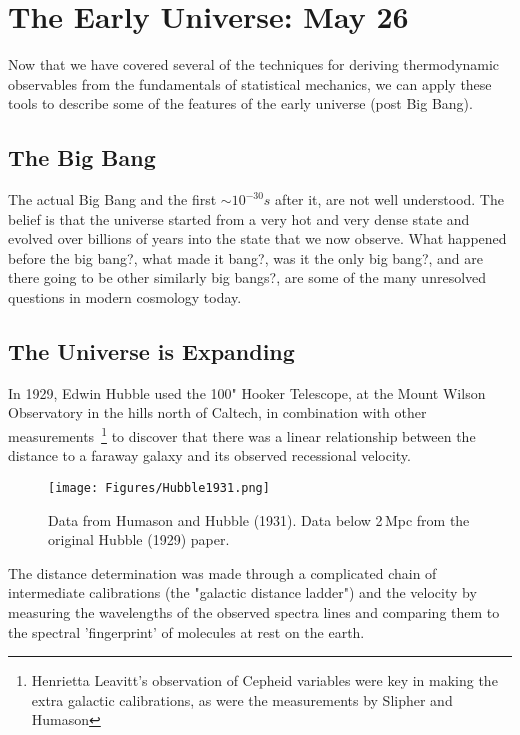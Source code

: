 \section{The Early Universe: May 26}
Now that we have covered several of the techniques for deriving thermodynamic observables from the fundamentals of statistical mechanics, we can apply these tools to describe some of the features of the early universe (post Big Bang).


\subsection{The Big Bang}
The actual Big Bang and the first $\sim 10^{-30} s$ after it, are not well understood. The belief is that the universe started from a very hot and very dense state and evolved over billions of years into the state that we now observe. What happened before the big bang?, what made it bang?, was it the only big bang?, and are there going to be other similarly big bangs?, are some of the many unresolved questions in modern cosmology today.

\subsection{The Universe is Expanding}
In 1929, Edwin Hubble used the 100" Hooker Telescope, at the Mount Wilson Observatory in the hills north of Caltech, in combination with other
measurements~\footnote{Henrietta Leavitt's observation of Cepheid variables were key in making the extra galactic calibrations, as were the measurements by
Slipher and Humason} to discover that there was a linear relationship between the distance to a faraway galaxy and its observed recessional velocity.
\begin{figure}[h]
\centering
\texttt{[image: Figures/Hubble1931.png]}
\caption{Data from Humason and Hubble (1931). Data below 2\,Mpc from
	the original Hubble (1929) paper.}
\label{fig:Hubble}
\end{figure}
The distance determination was made through a complicated chain of intermediate calibrations (the "galactic distance ladder") and the velocity by measuring the wavelengths of the observed spectra lines and comparing them to the spectral 'fingerprint' of molecules at rest on the earth.\\

